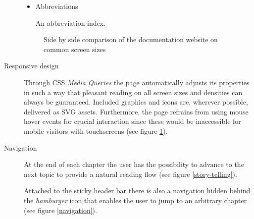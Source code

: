 \begin{description}
\begin{itemize}
		\item Abbreviations

		An abbreviation index.

	\end{itemize}

	\begin{figure}[H]
		\caption{Side by side comparison of the documentation website on common screen sizes}
		\label{responsive-design}
	\end{figure}

	\item[Responsive design]\hfill

	Through \ac{CSS} \textit{Media Queries} the page automatically adjusts its properties in such a way that pleasant reading on all screen sizes and densities can always be guaranteed. Included graphics and icons are, wherever possible, delivered as \ac{SVG} assets. Furthermore, the page refrains from using mouse hover events for crucial interaction since these would be inaccessible for mobile visitors with touchscreens (see figure \ref{responsive-design}).

	\item[Navigation]\hfill

	At the end of each chapter the user has the possibility to advance to the next topic to provide a natural reading flow (see figure \ref{story-telling}).

	Attached to the sticky header bar there is also a navigation hidden behind the \textit{hamburger} icon that enables the user to jump to an arbitrary chapter (see figure \ref{navigation}).


\end{description}
